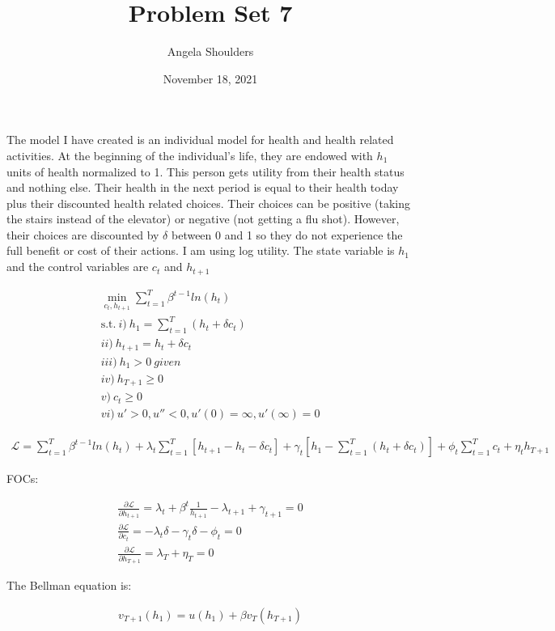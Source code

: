 \documentclass{article}[12pt]
\begin{document}
\title{Problem Set 7}
\author{Angela Shoulders}
\date{November 18, 2021}

\maketitle

The model I have created is an individual model for health and health related activities.  At the beginning of the individual's life, they are endowed with $h_1$ units of health normalized to 1.  This person gets utility from their health status and nothing else.  Their health in the next period is equal to their health today plus their discounted health related choices.  Their choices can be positive (taking the stairs instead of the elevator) or negative (not getting a flu shot).  However, their choices are discounted by $\delta$ between 0 and 1 so they do not experience the full benefit or cost of their actions.  I am using log utility.  The state variable is $h_1$ and the control variables are $c_t$ and $h_{t+1}$

\begin{equation}
\begin{aligned}
    \label{eq:max}
    \min_{c_t, h_{t+1}} \sum_{t=1}^T \beta^{t-1} ln(h_t) \\
    \textrm{s.t.} \ i) \ h_1 = \sum_{t=1}^T(h_t + \delta c_t) \\
    ii) \ h_{t+1} = h_t + \delta c_t \\
    iii) \ h_1 > 0 \ given \\
    iv) \ h_{T+1} \geq0 \\
    v) \ c_t \geq0 \\
    vi) \ u' > 0, u'' < 0 , u'(0) = \infty, u'(\infty) = 0
\end{aligned}
\end{equation}

\begin{equation}
\begin{aligned}
    \label{eq:lagrangian}
    \mathcal{L} = \sum_{t=1}^T \beta^{t-1} ln(h_t) +  \lambda_t \sum_{t=1}^T [h_{t+1} - h_t - \delta c_t] + \gamma_t[h_1 - \sum_{t=1}^T(h_t + \delta c_t)] + \phi_t \sum_{t=1}^T c_t + \eta_t h_{T+1}
\end{aligned}
\end{equation}

FOCs:

\begin{equation}
\begin{aligned}
    \label{eq:fonc}
    \frac{\partial \mathcal{L}}{\partial h_{t+1}} = \lambda_t + \beta ^t \frac{1}{h_{t+1}} - \lambda_{t+1} + \gamma_{t+1} = 0 \\
    \frac{\partial \mathcal{L}}{\partial c_t} = -\lambda_t \delta - \gamma_t \delta - \phi_t = 0 \\
    \frac{\partial \mathcal{L}}{\partial h_{T+1}} = \lambda_T + \eta_T = 0
\end{aligned}
\end{equation}

The Bellman equation is:

\begin{equation}
\begin{aligned}
    \label{eq:bellman}
    v_{T+1}(h_1) = u(h_1) + \beta v_T (h_{T+1})
\end{aligned}
\end{equation}
\end{document}
